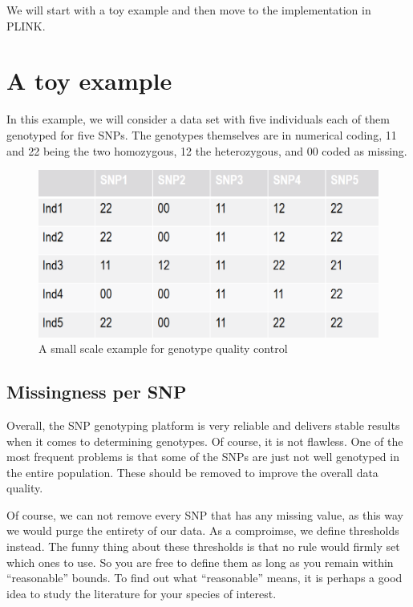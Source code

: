 \documentclass[]{book}
\begin{document}
We will start with a toy example and then move to the implementation in
PLINK.

\section{A toy example}\label{a-toy-example}

In this example, we will consider a data set with five individuals each
of them genotyped for five SNPs. The genotypes themselves are in
numerical coding, 11 and 22 being the two homozygous, 12 the
heterozygous, and 00 coded as missing.

\begin{figure}
\includegraphics[width=13.19in]{images/8-1-qualityControlToyExample} \caption{A small scale example for genotype quality control}\label{fig:fig8-1}
\end{figure}

\subsection{Missingness per SNP}\label{missingness-per-snp}

Overall, the SNP genotyping platform is very reliable and delivers
stable results when it comes to determining genotypes. Of course, it is
not flawless. One of the most frequent problems is that some of the SNPs
are just not well genotyped in the entire population. These should be
removed to improve the overall data quality.

Of course, we can not remove every SNP that has any missing value, as
this way we would purge the entirety of our data. As a comproimse, we
define thresholds instead. The funny thing about these thresholds is
that no rule would firmly set which ones to use. So you are free to
define them as long as you remain within ``reasonable'' bounds. To find
out what ``reasonable'' means, it is perhaps a good idea to study the
literature for your species of interest.
\end{document}
